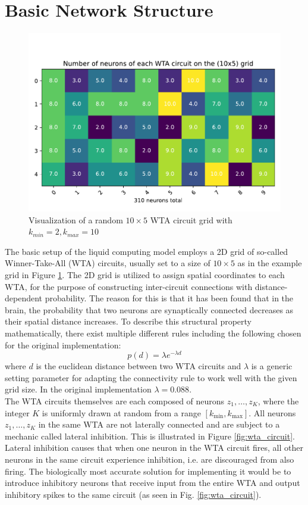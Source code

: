 \section{Basic Network Structure} \label{sec:basic_network_structure} %
\begin{figure}[htbp]
  \centering
  \includegraphics[width=0.9\columnwidth]{Figures/circuit_grid2D.pdf}
  \caption{Visualization of a random $10\times 5$ WTA circuit grid with $k_{min}=2, k_{max}=10$}
  \label{fig:circuit_grid}
\end{figure}
The basic setup of the liquid computing model employs a 2D grid of so-called Winner-Take-All (WTA) circuits, usually set to a size of $10\times 5$ as in the example grid in Figure \ref{fig:circuit_grid}. The 2D grid is utilized to assign spatial coordinates to each WTA, for the purpose of constructing inter-circuit connections with distance-dependent probability. The reason for this is that it has been found that in the brain, the probability that two neurons are synaptically connected decreases as their spatial distance increases. To describe this structural property mathematically, there exist multiple different rules including the following chosen for the original implementation:
\begin{equation}
    p(d)=\lambda e^{-\lambda d} \label{eqn:distance_dependent_probability}
\end{equation}
where $d$ is the euclidean distance between two WTA circuits and $\lambda$ is a generic setting parameter for adapting the connectivity rule to work well with the given grid size. In the original implementation $\lambda=0.088$.\\
The WTA circuits themselves are each composed of neurons $z_1, \dots, z_K$, where the integer $K$ is uniformly drawn at random from a range $[k_{\min}, k_{\max}]$. All neurons $z_1, \dots, z_K$ in the same WTA are not laterally connected and are subject to a mechanic called lateral inhibition. This is illustrated in Figure \ref{fig:wta_circuit}. Lateral inhibition causes that when one neuron in the WTA circuit fires, all other neurons in the same circuit experience inhibition, i.e. are discouraged from also firing. The biologically most accurate solution for implementing it would be to introduce inhibitory neurons that receive input from the entire WTA and output inhibitory spikes to the same circuit (as seen in Fig. \ref{fig:wta_circuit}).\\
